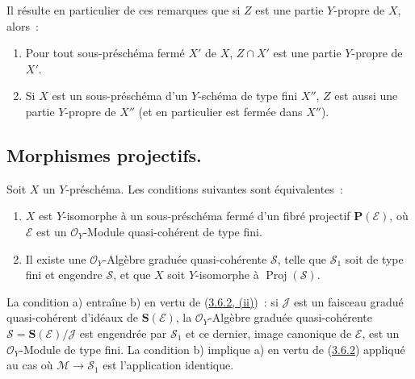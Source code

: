 Il résulte en particulier de ces remarques que si $Z$ est une partie
$Y$-propre de $X$, alors~:
\begin{enumerate}
  \item[\rm{1\textsuperscript{o}}] Pour tout sous-préschéma fermé $X'$ de
  $X$, $Z\cap X'$ est une partie $Y$-propre de $X'$.
  \item[\rm{2\textsuperscript{o}}] Si $X$ est un sous-préschéma d'un
  $Y$-schéma de type fini $X''$, $Z$ est aussi une partie $Y$-propre de
  $X''$ (et en particulier est fermée dans $X''$).
\end{enumerate}

\subsection{Morphismes projectifs.}
\label{subsection:II.5.5-fr}

\begin{proposition}[5.5.1]
\label{II.5.5.1-fr}
Soit $X$ un $Y$-préschéma. Les conditions suivantes sont équivalentes~:
\begin{enumerate}
  \item[\rm{a)}] $X$ est $Y$-isomorphe à un sous-préschéma fermé d'un fibré
  projectif $\mathbf{P}(\mathcal{E})$, où $\mathcal{E}$ est un
  $\mathcal{O}_Y$-Module quasi-cohérent de type fini.
  \item[\rm{b)}] Il existe une $\mathcal{O}_Y$-Algèbre graduée
  quasi-cohérente $\mathcal{S}$, telle que $\mathcal{S}_1$ soit de type fini
  et engendre $\mathcal{S}$, et que $X$ soit $Y$-isomorphe à
  $\operatorname{Proj}(\mathcal{S})$.
\end{enumerate}
\end{proposition}

La condition a) entraîne b) en vertu de
(\hyperref[II.3.6.2-fr]{3.6.2, (ii)})~: si $\mathcal{J}$ est un faisceau
gradué quasi-cohérent d'idéaux de $\mathbf{S}(\mathcal{E})$, la
$\mathcal{O}_Y$-Algèbre graduée quasi-cohérente
$\mathcal{S}=\mathbf{S}(\mathcal{E})/\mathcal{J}$ est engendrée par
$\mathcal{S}_1$ et ce dernier, image canonique de $\mathcal{E}$, est un
$\mathcal{O}_Y$-Module de type fini. La condition b) implique a) en vertu de
(\hyperref[II.3.6.2-fr]{3.6.2}) appliqué au cas où
$\mathcal{M}\to\mathcal{S}_1$ est l'application identique.

